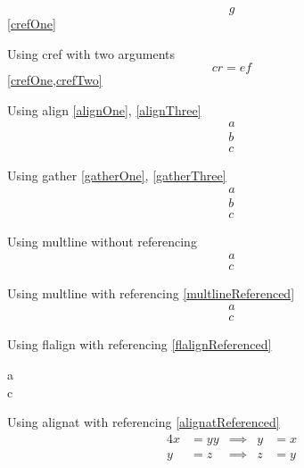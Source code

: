 \documentclass{article}
\def\ifautonum#1{#1}%
\def\ifautonum#1{}%
\begin{document}
\begin{itemize}
{				\begin{equation}\label{crefOne}
					g
				\end{equation}
				\cref{crefOne}
			\item Using cref with two arguments
				\begin{equation}\label{crefTwo}
					cr = ef
				\end{equation}
				\cref{crefOne,crefTwo}
			\ifautonum{
				\item Using otherwise unused cref with two arguments (needs autonum)
					\[\label{crefThree}
						cr = ef
					\]
					\[\label{crefFour}
						cr = ef
					\]
					\cref{crefThree,crefFour}
			}
		}
		\item Using align \ref{alignOne}, \ref{alignThree}
			\begin{align}
				a\label{alignOne}\\
				b\label{alignTwo}\\
				c\label{alignThree}
			\end{align}
		\item Using gather \ref{gatherOne}, \ref{gatherThree}
			\begin{gather}
				a\label{gatherOne}\\
				b\label{gatherTwo}\\
				c\label{gatherThree}
			\end{gather}
		\item Using multline without referencing
			\begin{multline}
				a\\
				c\label{multlineUnreferenced}
			\end{multline}
		\item Using multline with referencing \ref{multlineReferenced}
			\begin{multline}
				a\\
				c\label{multlineReferenced}
			\end{multline}
		\item Using flalign with referencing \ref{flalignReferenced}
			\begin{flalign}
				a\\
				c\label{flalignReferenced}
			\end{flalign}
		\item Using alignat with referencing \ref{alignatReferenced}
			\begin{alignat}{4}
				x &= yy & \implies & y &= x \label{alignatUnreferenced}\\
				y &= z & \implies & z &= y \label{alignatReferenced}

\end{alignat}
\end{itemize}
\end{document}
